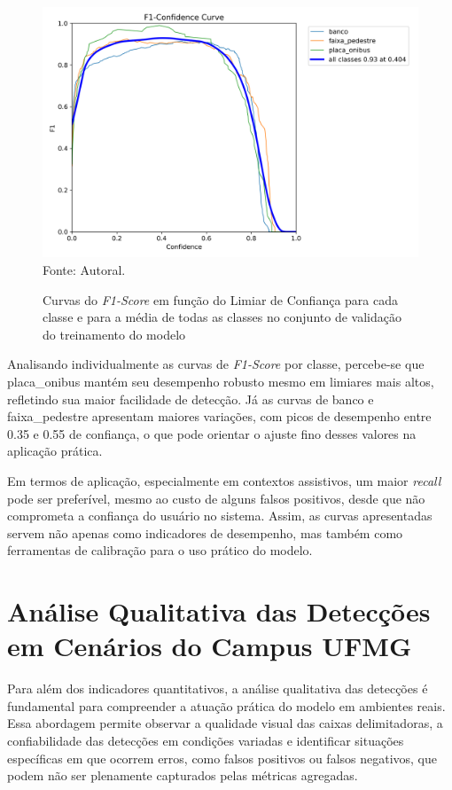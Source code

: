 \begin{figure}[htbp]
  \centering
  \caption{Curvas do \textit{F1-Score} em função do Limiar de Confiança para cada classe e para a média de todas as classes no conjunto de validação do treinamento do modelo}
  \includegraphics[width=1\textwidth]{Figuras/F1_curve.png}
  \\
  Fonte: Autoral.
  \label{fg-f1_curve}
\end{figure}

Analisando individualmente as curvas de \textit{F1-Score} por classe, percebe-se que placa\_onibus mantém seu desempenho robusto mesmo em limiares mais altos, refletindo sua maior facilidade de detecção. Já as curvas de banco e faixa\_pedestre apresentam maiores variações, com picos de desempenho entre 0.35 e 0.55 de confiança, o que pode orientar o ajuste fino desses valores na aplicação prática.

Em termos de aplicação, especialmente em contextos assistivos, um maior \textit{recall} pode ser preferível, mesmo ao custo de alguns falsos positivos, desde que não comprometa a confiança do usuário no sistema. Assim, as curvas apresentadas servem não apenas como indicadores de desempenho, mas também como ferramentas de calibração para o uso prático do modelo.

\section{Análise Qualitativa das Detecções em Cenários do Campus UFMG}

Para além dos indicadores quantitativos, a análise qualitativa das detecções é fundamental para compreender a atuação prática do modelo em ambientes reais. Essa abordagem permite observar a qualidade visual das caixas delimitadoras, a confiabilidade das detecções em condições variadas e identificar situações específicas em que ocorrem erros, como falsos positivos ou falsos negativos, que podem não ser plenamente capturados pelas métricas agregadas.

